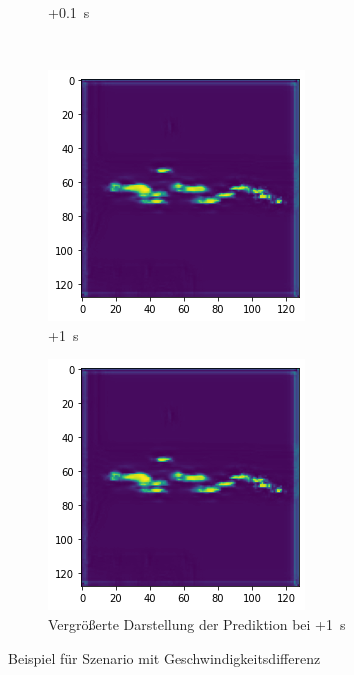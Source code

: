 \documentclass[12pt]{article}
\begin{document}
\begin{figure}[H]
\begin{subfigure}[b]{0.18\textwidth}
                \caption{+0.1~s}
            \end{subfigure}
            ~
            \begin{subfigure}[b]{0.18\textwidth}
                \includegraphics[width=\textwidth]{output_static_brake_4.png}
                \caption{+1~s}
            \end{subfigure}
            \vspace{1cm}
            \begin{subfigure}[b]{0.6\textwidth}
                \includegraphics[width=\textwidth]{output_static_brake_4.png}
                \caption{Vergrößerte Darstellung der Prediktion bei +1~s}
            \end{subfigure}
            \caption{Beispiel für Szenario mit Geschwindigkeitsdifferenz}\label{fig:out_static_brake}
        \end{figure}
    \pagebreak
\end{document}
